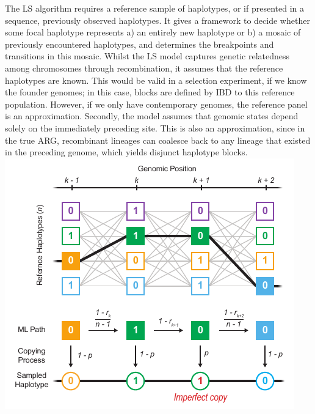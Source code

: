 \documentclass[twocolumn]{bmcart}%
\begin{document}
\begin{strip}
\begin{tcolorbox}[colback=white,colframe=blue!50!black,title= Box 3: Application and limits of Li and Stephens Model ]
\begin{multicols}{2}
{The LS algorithm requires a reference sample of haplotypes, or if presented in a sequence, previously observed haplotypes. It gives a framework to decide whether some focal haplotype represents a) an entirely new haplotype or b) a mosaic of previously encountered haplotypes, and determines the breakpoints and transitions in this mosaic. Whilst the LS model captures genetic relatedness among chromosomes through recombination, it assumes that the reference haplotypes are known. This would be valid in a selection experiment, if we know the founder genomes; in this case, blocks are defined by IBD to this reference population. However, if we only have contemporary genomes, the reference panel is an approximation. Secondly, the model assumes that genomic states depend solely on the immediately preceding site. This is also an approximation, since in the true ARG, recombinant lineages can coalesce back to any lineage that existed in the preceding genome, which yields disjunct haplotype blocks.}
 \includegraphics[width=0.99\linewidth]{Fig_B2.pdf}
    
\end{multicols}
\end{tcolorbox}
\end{strip}
\end{document}
